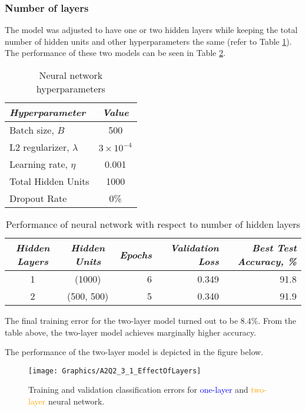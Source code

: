 \documentclass[a4paper,12pt]{article}
\begin{document}
\clearpage
\subsubsection{Number of layers}

The model was adjusted to have one or two hidden layers while keeping the total number of hidden units and other hyperparameters the same (refer to Table \ref{table:NN_HParam_2_3_2}). The performance of these two models can be seen in Table \ref{table:NN_NumLayers}.

\begin{table}[!htb]
\centering
\caption{Neural network hyperparameters}
\label{table:NN_HParam_2_3_2}
\vspace{0.5em}
\begin{tabular}{|l|c|} \hline
\textit{Hyperparameter} & \textit{Value} \\ \hline
Batch size, $B$ & 500 \\
L2 regularizer, $\lambda$ & $3 \times 10^{-4}$  \\
Learning rate, $\eta$ & 0.001 \\
Total Hidden Units & 1000 \\
Dropout Rate & 0\% \\
\hline
\end{tabular}
\end{table}

\begin{table}[!htb]
\centering
\caption{Performance of neural network with respect to number of hidden layers}
\label{table:NN_NumLayers}
\vspace{0.5em}
\begin{tabular}{|c c|r r r|} \hline
\textit{Hidden Layers} & \textit{Hidden Units} & \textit{Epochs} & \textit{Validation Loss} & \textit{Best Test Accuracy, \%} \\ \hline
1 & (1000) & 6 & 0.349 & 91.8 \\
2 & (500, 500) & 5 & 0.340 & 91.9 \\
\hline
\end{tabular}
\end{table}

The final training error for the two-layer model turned out to be $8.4\%$. From the table above, the two-layer model achieves marginally higher accuracy.

The performance of the two-layer model is depicted in the figure below.

\begin{figure}[!htb]
\centering
\texttt{[image: Graphics/A2Q2\_3\_1\_EffectOfLayers]}
\caption{\label{figure:NN_EffectOfLayers} Training and validation classification errors for \textcolor{blue}{one-layer} and \textcolor{orange}{two-layer} neural network.}
\end{figure}
\end{document}
